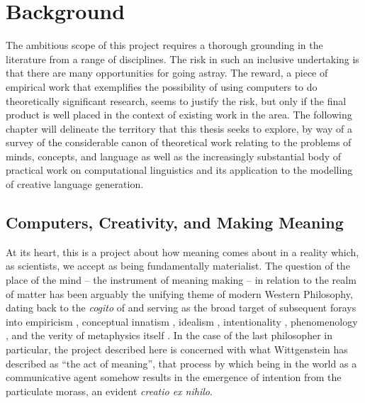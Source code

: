 \chapter{Background}
The ambitious scope of this project requires a thorough grounding in the literature from a range of disciplines.  The risk in such an inclusive undertaking is that there are many opportunities for going astray.  The reward, a piece of empirical work that exemplifies the possibility of using computers to do theoretically significant research, seems to justify the risk, but only if the final product is well placed in the context of existing work in the area.  The following chapter will delineate the territory that this thesis seeks to explore, by way of a survey of the considerable canon of theoretical work relating to the problems of minds, concepts, and language as well as the increasingly substantial body of practical work on computational linguistics and its application to the modelling of creative language generation.

\section{Computers, Creativity, and Making Meaning}
At its heart, this is a project about how meaning comes about in a reality which, as scientists, we accept as being fundamentally materialist.  The question of the place of the mind -- the instrument of meaning making -- in relation to the realm of matter has been arguably the unifying theme of modern Western Philosophy, dating back to the \emph{cogito} of \cite{Descartes} and serving as the broad target of subsequent forays into empiricism \citep{Locke,Hume}, conceptual innatism \citep{Kant}, idealism \citep{Hegel}, intentionality \cite{Bretano}, phenomenology \citep{Husserl,Heidegger}, and the verity of metaphysics itself \citep{Wittgenstein}.  In the case of the last philosopher in particular, the project described here is concerned with what Wittgenstein has described as ``the act of meaning'', that process by which being in the world as a communicative agent somehow results in the emergence of intention from the particulate morass, an evident \emph{creatio ex nihilo}.

